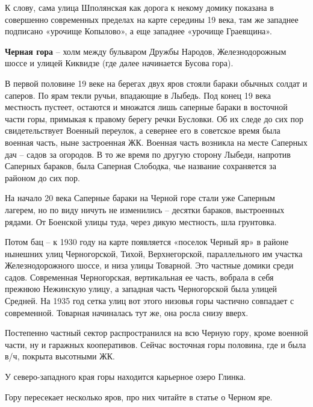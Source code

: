 К слову, сама улица Шполянская как дорога к некому домику показана в совершенно современных пределах на карте середины 19 века, там же западнее подписано «урочище Копылово», а еще западнее «урочище Граевщина».\\

\medskip

\textbf{Черная гора} – холм между бульваром Дружбы Народов, Железнодорожным шоссе и улицей Киквидзе (где далее начинается Бусова гора). 

В первой половине 19 веке на берегах двух яров стояли бараки обычных солдат и саперов. По ярам текли ручьи, впадающие в Лыбедь. Под конец 19 века местность пустеет, остаются и множатся лишь саперные бараки в восточной части горы, примыкая к правому берегу речки Бусловки. Об их следе до сих пор свидетельствует Военный переулок, а севернее его в советское время была военная часть, ныне застроенная ЖК. Военная часть возникла на месте Саперных дач – садов за огородов. В то же время по другую сторону Лыбеди, напротив Саперных бараков, была Саперная Слободка, чье название сохраняется за районом до сих пор.

На начало 20 века Саперные бараки на Черной горе стали уже Саперным лагерем, но по виду ничуть не изменились – десятки бараков, выстроенных рядами. От Боенской улицы туда, через дикую местность, шла грунтовка. 

Потом бац – к 1930 году на карте появляется «поселок Черный яр» в районе нынешних улиц Черногорской, Тихой, Верхнегорской, параллельного им участка Железнодорожного шоссе, и низа улицы Товарной. Это частные домики среди садов. Современная Черногорская, вертикальная ее часть, вобрала в себя прежнюю Нежинскую улицу, а западная часть Черногорской была улицей Средней. На 1935 год сетка улиц вот этого низовья горы частично совпадает с современной. Товарная начиналась тут же, она росла снизу вверх. 

Постепенно частный сектор распространился на всю Черную гору, кроме военной части, ну и гаражных кооперативов. Сейчас восточная горы половина, где и была в/ч, покрыта высотными ЖК.

У северо-западного края горы находится карьерное озеро Глинка.


Гору пересекает несколько яров, про них читайте в статье о Черном яре.\\

